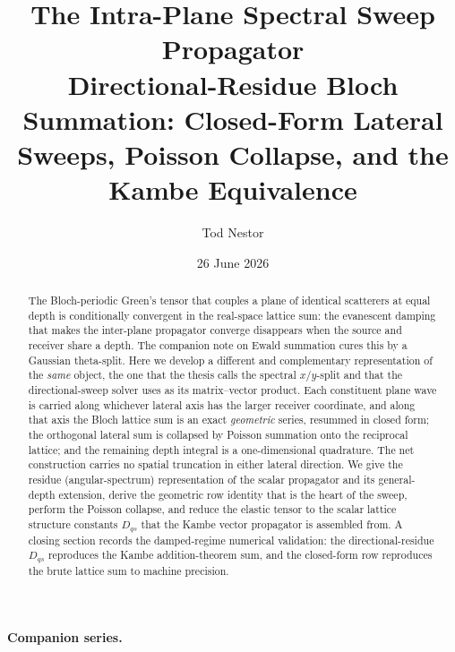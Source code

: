 \documentclass[11pt,a4paper]{article}
\title{\bfseries The Intra-Plane Spectral Sweep Propagator\\[4pt]
\large Directional-Residue Bloch Summation: Closed-Form Lateral Sweeps,
Poisson Collapse, and the Kambe Equivalence}
\author{Tod Nestor}
\date{26 June 2026}
\newcommand{\Dqs}{D_{q s}}
\begin{document}
\maketitle

\begin{abstract}
The Bloch-periodic Green's tensor that couples a plane of identical scatterers
at equal depth is conditionally convergent in the real-space lattice sum: the
evanescent damping that makes the inter-plane propagator converge disappears
when the source and receiver share a depth. The companion note on Ewald
summation cures this by a Gaussian theta-split. Here we develop a different and
complementary representation of the \emph{same} object, the one that the thesis
calls the spectral $x/y$-split and that the directional-sweep solver uses as its
matrix--vector product. Each constituent plane wave is carried along whichever
lateral axis has the larger receiver coordinate, and along that axis the
Bloch lattice sum is an exact \emph{geometric} series, resummed in closed form;
the orthogonal lateral sum is collapsed by Poisson summation onto the reciprocal
lattice; and the remaining depth integral is a one-dimensional quadrature. The
net construction carries no spatial truncation in either lateral direction.
We give the residue (angular-spectrum) representation of the scalar propagator
and its general-depth extension, derive the geometric row identity that is the
heart of the sweep, perform the Poisson collapse, and reduce the elastic tensor
to the scalar lattice structure constants $\Dqs$ that the Kambe vector
propagator is assembled from. A closing section records the damped-regime
numerical validation: the directional-residue $\Dqs$ reproduces the Kambe
addition-theorem sum, and the closed-form row reproduces the brute lattice sum
to machine precision.
\end{abstract}

\bigskip
\noindent\textbf{Companion series.}
\end{document}
